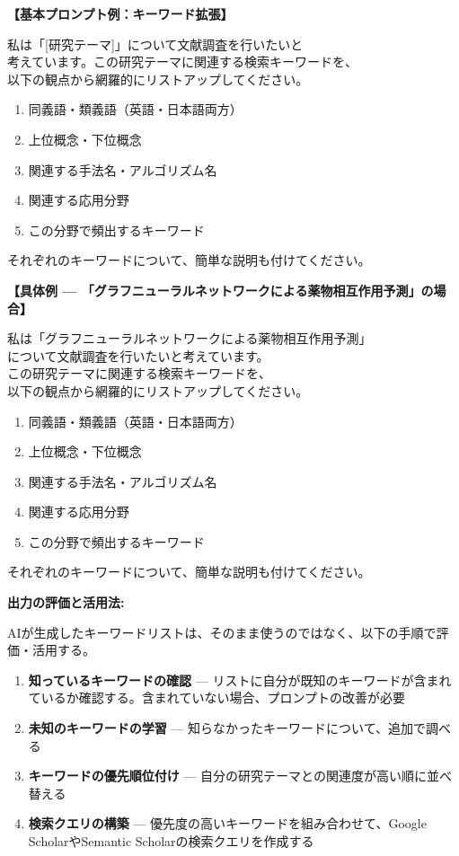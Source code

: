 \begin{promptbox}
\textbf{【基本プロンプト例：キーワード拡張】}

私は「[研究テーマ]」について文献調査を行いたいと\\
考えています。この研究テーマに関連する検索キーワードを、\\
以下の観点から網羅的にリストアップしてください。

\begin{enumerate}
\item 同義語・類義語（英語・日本語両方）
\item 上位概念・下位概念
\item 関連する手法名・アルゴリズム名
\item 関連する応用分野
\item この分野で頻出するキーワード
\end{enumerate}

それぞれのキーワードについて、簡単な説明も付けてください。
\end{promptbox}

\begin{promptbox}
\textbf{【具体例 --- 「グラフニューラルネットワークによる薬物相互作用予測」の場合】}

私は「グラフニューラルネットワークによる薬物相互作用予測」\\
について文献調査を行いたいと考えています。\\
この研究テーマに関連する検索キーワードを、\\
以下の観点から網羅的にリストアップしてください。

\begin{enumerate}
\item 同義語・類義語（英語・日本語両方）
\item 上位概念・下位概念
\item 関連する手法名・アルゴリズム名
\item 関連する応用分野
\item この分野で頻出するキーワード
\end{enumerate}

それぞれのキーワードについて、簡単な説明も付けてください。
\end{promptbox}

\textbf{出力の評価と活用法:}

AIが生成したキーワードリストは、そのまま使うのではなく、以下の手順で評価・活用する。

\begin{enumerate}
\item \textbf{知っているキーワードの確認} --- リストに自分が既知のキーワードが含まれているか確認する。含まれていない場合、プロンプトの改善が必要
\item \textbf{未知のキーワードの学習} --- 知らなかったキーワードについて、追加で調べる
\item \textbf{キーワードの優先順位付け} --- 自分の研究テーマとの関連度が高い順に並べ替える
\item \textbf{検索クエリの構築} --- 優先度の高いキーワードを組み合わせて、Google ScholarやSemantic Scholarの検索クエリを作成する
\end{enumerate}

